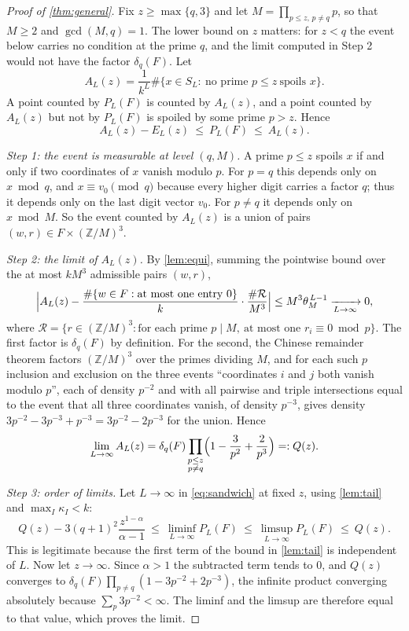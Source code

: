 \documentclass[11pt]{amsart}
\theoremstyle{definition}
\theoremstyle{remark}
\begin{document}
\begin{proof}[Proof of \cref{thm:general}]
Fix $z\ge\max\{q,3\}$ and let $M=\prod_{p\le z,\,p\ne q}p$, so that $M\ge2$ and $\gcd(M,q)=1$. The lower bound on $z$ matters: for $z<q$ the event below carries no condition at the prime $q$, and the limit computed in Step 2 would not have the factor $\delta_q(F)$. Let
\[
A_L(z)=\frac1{k^L}\#\{x\in S_L:\ \text{no prime }p\le z\ \text{spoils }x\}.
\]
A point counted by $P_L(F)$ is counted by $A_L(z)$, and a point counted by $A_L(z)$ but not by $P_L(F)$ is spoiled by some prime $p>z$. Hence
\begin{equation}
\label{eq:sandwich}
A_L(z)-E_L(z)\ \le\ P_L(F)\ \le\ A_L(z).
\end{equation}

\emph{Step 1: the event is measurable at level $(q,M)$.} A prime $p\le z$ spoils $x$ if and only if two coordinates of $x$ vanish modulo $p$. For $p=q$ this depends only on $x\bmod q$, and $x\equiv v_0\pmod q$ because every higher digit carries a factor $q$; thus it depends only on the last digit vector $v_0$. For $p\ne q$ it depends only on $x\bmod M$. So the event counted by $A_L(z)$ is a union of pairs $(w,r)\in F\times(\mathbb Z/M)^3$.

\emph{Step 2: the limit of $A_L(z)$.} By \cref{lem:equi}, summing the pointwise bound over the at most $kM^3$ admissible pairs $(w,r)$,
\[
\Bigl|A_L(z)-\frac{\#\{w\in F:\text{at most one entry }0\}}{k}\cdot\frac{\#\mathcal R}{M^3}\Bigr|\le M^3\theta_M^{\,L-1}\xrightarrow[L\to\infty]{}0,
\]
where $\mathcal R=\{r\in(\mathbb Z/M)^3:\text{for each prime }p\mid M,\ \text{at most one }r_i\equiv0\bmod p\}$. The first factor is $\delta_q(F)$ by definition. For the second, the Chinese remainder theorem factors $(\mathbb Z/M)^3$ over the primes dividing $M$, and for each such $p$ inclusion and exclusion on the three events ``coordinates $i$ and $j$ both vanish modulo $p$'', each of density $p^{-2}$ and with all pairwise and triple intersections equal to the event that all three coordinates vanish, of density $p^{-3}$, gives density $3p^{-2}-3p^{-3}+p^{-3}=3p^{-2}-2p^{-3}$ for the union. Hence
\[
\lim_{L\to\infty}A_L(z)=\delta_q(F)\prod_{\substack{p\le z\\ p\ne q}}\Bigl(1-\frac3{p^2}+\frac2{p^3}\Bigr)=:Q(z).
\]

\emph{Step 3: order of limits.} Let $L\to\infty$ in \eqref{eq:sandwich} at fixed $z$, using \cref{lem:tail} and $\max_I\kappa_I<k$:
\[
Q(z)-3(q+1)^2\frac{z^{1-\alpha}}{\alpha-1}\ \le\ \liminf_{L\to\infty}P_L(F)\ \le\ \limsup_{L\to\infty}P_L(F)\ \le\ Q(z).
\]
This is legitimate because the first term of the bound in \cref{lem:tail} is independent of $L$. Now let $z\to\infty$. Since $\alpha>1$ the subtracted term tends to $0$, and $Q(z)$ converges to $\delta_q(F)\prod_{p\ne q}(1-3p^{-2}+2p^{-3})$, the infinite product converging absolutely because $\sum_p3p^{-2}<\infty$. The liminf and the limsup are therefore equal to that value, which proves the limit.


\end{proof}
\end{document}
